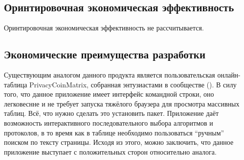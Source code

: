 \subsection{Оринтировочная экономическая эффективность}
Оринтировочная экономическая эффективность не рассчитывается.

\subsection{Экономические преимущества разработки}
Существующим аналогом данного продукта является пользовательская онлайн-таблица
PrivacyCoinMatrix, собранная энтузиастами в сообществе (\cite{reddit}). В силу
того, что данное приложение имеет интерфейс командной строки, оно легковеснне и
не требует запуска тяжёлого браузера для просмотра массивных таблиц. Всё, что
нужно сделать это установить пакет. Приложение даёт возможность интерактивного
последовательного выбора алгоритмов и протоколов, в то время как в таблице
необходимо пользоваться ``ручным'' поиском по тексту страницы. Исходя из этого,
можно заключить, что данное приложение выступает с положительных сторон
относительно аналога.
